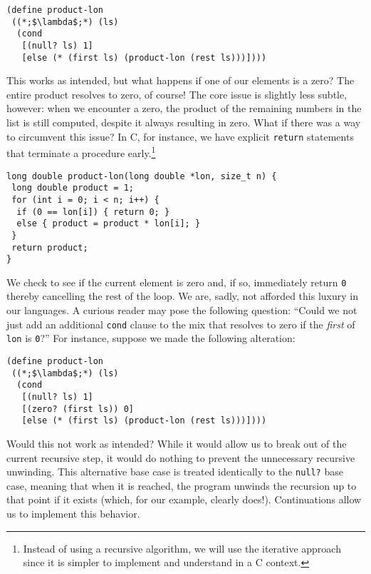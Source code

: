 \begin{cl}[]{}\begin{lstlisting}[language=MyScheme]
(define product-lon
 ((*;$\lambda$;*) (ls)
  (cond
   [(null? ls) 1]
   [else (* (first ls) (product-lon (rest ls)))])))
\end{lstlisting}\end{cl}

This works as intended, but what happens if one of our elements is a zero? The entire product resolves to zero, of course! The core issue is slightly less subtle, however: when we encounter a zero, the product of the remaining numbers in the list is still computed, despite it always resulting in zero. What if there was a way to circumvent this issue? In C, for instance, we have explicit \texttt{return} statements that terminate a procedure early.\footnote{Instead of using a recursive algorithm, we will use the iterative approach since it is simpler to implement and understand in a C context.}

\begin{cl}[]{}\begin{lstlisting}[language=MyC]
long double product-lon(long double *lon, size_t n) {
 long double product = 1;
 for (int i = 0; i < n; i++) {
  if (0 == lon[i]) { return 0; } 
  else { product = product * lon[i]; }
 }
 return product;
}
\end{lstlisting}\end{cl}

We check to see if the current element is zero and, if so, immediately return \texttt{0} thereby cancelling the rest of the loop. We are, sadly, not afforded this luxury in our languages. A curious reader may pose the following question: ``Could we not just add an additional \texttt{cond} clause to the mix that resolves to zero if the \textit{first} of \texttt{lon} is \texttt{0}?'' For instance, suppose we made the following alteration:

\begin{cl}[]{}\begin{lstlisting}[language=MyScheme]
(define product-lon
 ((*;$\lambda$;*) (ls)
  (cond
   [(null? ls) 1]
   [(zero? (first ls)) 0]
   [else (* (first ls) (product-lon (rest ls)))])))
\end{lstlisting}\end{cl}

Would this not work as intended? While it would allow us to break out of the current recursive step, it would do nothing to prevent the unnecessary recursive unwinding. This alternative base case is treated identically to the \texttt{null?} base case, meaning that when it is reached, the program unwinds the recursion up to that point if it exists (which, for our example, clearly does!). Continuations allow us to implement this behavior.

